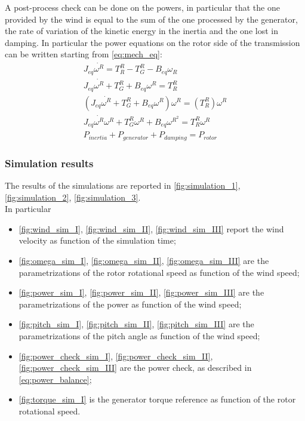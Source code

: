A post-process check can be done on the powers, in particular that the one provided by the wind is equal to the sum of the one processed by the generator, the rate of variation of the kinetic energy in the inertia and the one lost in damping. In particular the power equations on the rotor side of the transmission can be written starting from \autoref{eq:mech_eq}:
\begin{gather}
    J_{eq}\dot{\omega^{R}} = T_R^R - T_G^R-B_{eq}\omega_R\\
    J_{eq}\dot{\omega^{R}} + T_G^R + B_{eq}\omega^R = T_R^R\\
    \left(J_{eq}\dot{\omega^{R}} + T_G^R + B_{eq}\omega^R\right)\omega^R = \left(T_R^R\right)\omega^R\\
    J_{eq}\dot{\omega^{R}}\omega^{R} + T_G^{R}\omega^{R} + B_{eq}\omega^{R^{2}} = T_R^{R}\omega^{R}\\
    P_{inertia} + P_{generator} + P_{damping} = P_{rotor} 
    \label{eq:power_balance}
\end{gather}

\subsubsection{Simulation results}
The results of the simulations are reported in \autoref{fig:simulation_1}, \ref{fig:simulation_2}, \ref{fig:simulation_3}. \\
In particular
\begin{itemize}
  \item \autoref{fig:wind_sim_I}, \ref{fig:wind_sim_II}, \ref{fig:wind_sim_III} report the wind velocity as function of the simulation time;
  \item \autoref{fig:omega_sim_I}, \ref{fig:omega_sim_II}, \ref{fig:omega_sim_III} are the parametrizations of the rotor rotational speed as function of the wind speed;
  \item \autoref{fig:power_sim_I}, \ref{fig:power_sim_II}, \ref{fig:power_sim_III} are the parametrizations of the power as function of the wind speed;
  \item \autoref{fig:pitch_sim_I}, \ref{fig:pitch_sim_II}, \ref{fig:pitch_sim_III} are the parametrizations of the pitch angle as function of the wind speed;
  \item \autoref{fig:power_check_sim_I}, \ref{fig:power_check_sim_II}, \ref{fig:power_check_sim_III} are the power check, as described in \autoref{eq:power_balance};
  \item \autoref{fig:torque_sim_I} is the generator torque reference as function of the rotor rotational speed.
\end{itemize}

